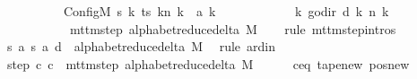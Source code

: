 \begin{isabellebody}
\ \ \ \ \ \ \ \ \ \ Config\isactrlsub M\ {\isacharquery}{\kern0pt}s{\isacharprime}{\kern0pt}\ {\isacharparenleft}{\kern0pt}{\isasymlambda}k{\isachardot}{\kern0pt}\ {\isacharparenleft}{\kern0pt}ts\ k{\isacharparenright}{\kern0pt}{\isacharparenleft}{\kern0pt}n\ k\ {\isacharcolon}{\kern0pt}{\isacharequal}{\kern0pt}\ {\isacharquery}{\kern0pt}a{\isacharprime}{\kern0pt}\ k{\isacharparenright}{\kern0pt}{\isacharparenright}{\kern0pt}\isanewline
\ \ \ \ \ \ \ \ \ \ \ \ {\isacharparenleft}{\kern0pt}{\isasymlambda}k{\isachardot}{\kern0pt}\ go{\isacharunderscore}{\kern0pt}dir\ {\isacharparenleft}{\kern0pt}{\isacharquery}{\kern0pt}d\ k{\isacharparenright}{\kern0pt}\ {\isacharparenleft}{\kern0pt}n\ k{\isacharparenright}{\kern0pt}{\isacharparenright}{\kern0pt}{\isacharparenright}{\kern0pt}\isanewline
\ \ \ \ \ \ \ \ \ \ {\isasymin}\ mttm{\isacharunderscore}{\kern0pt}step\ {\isacharparenleft}{\kern0pt}alphabet{\isacharunderscore}{\kern0pt}reduce{\isacharunderscore}{\kern0pt}delta\ M{\isacharparenright}{\kern0pt}{\isachardoublequoteclose}\isanewline
\ \ \isamarkupfalse%
\ {\isacharparenleft}{\kern0pt}rule\ mttm{\isacharunderscore}{\kern0pt}step{\isachardot}{\kern0pt}intros{\isacharparenright}{\kern0pt}\isanewline
\ \ \ \ \isamarkupfalse%
\ {\isachardoublequoteopen}{\isacharparenleft}{\kern0pt}{\isacharquery}{\kern0pt}s{\isacharcomma}{\kern0pt}\ {\isacharquery}{\kern0pt}a{\isacharcomma}{\kern0pt}\ {\isacharquery}{\kern0pt}s{\isacharprime}{\kern0pt}{\isacharcomma}{\kern0pt}\ {\isacharquery}{\kern0pt}a{\isacharprime}{\kern0pt}{\isacharcomma}{\kern0pt}\ {\isacharquery}{\kern0pt}d{\isacharparenright}{\kern0pt}\ {\isasymin}\ alphabet{\isacharunderscore}{\kern0pt}reduce{\isacharunderscore}{\kern0pt}delta\ M{\isachardoublequoteclose}\ \isamarkupfalse%
\ {\isacharparenleft}{\kern0pt}rule\ ard{\isacharunderscore}{\kern0pt}in{\isacharparenright}{\kern0pt}\isanewline
\ \ \isamarkupfalse%
\isanewline
\ \ \isamarkupfalse%
\ step{\isacharcolon}{\kern0pt}\ {\isachardoublequoteopen}{\isacharparenleft}{\kern0pt}c{\isacharprime}{\kern0pt}{\isacharcomma}{\kern0pt}\ {\isacharquery}{\kern0pt}c{\isacharprime}{\kern0pt}{\isacharprime}{\kern0pt}{\isacharparenright}{\kern0pt}\ {\isasymin}\ mttm{\isacharunderscore}{\kern0pt}step\ {\isacharparenleft}{\kern0pt}alphabet{\isacharunderscore}{\kern0pt}reduce{\isacharunderscore}{\kern0pt}delta\ M{\isacharparenright}{\kern0pt}{\isachardoublequoteclose}\isanewline
\ \ \ \ \isamarkupfalse%
\ c{\isacharprime}{\kern0pt}{\isacharunderscore}{\kern0pt}eq\ tape{\isacharunderscore}{\kern0pt}new\ pos{\isacharunderscore}{\kern0pt}new\ \isamarkupfalse%

\end{isabellebody}
